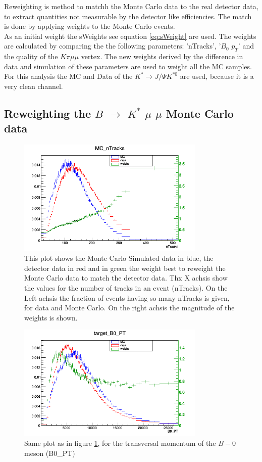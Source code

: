 \documentclass[english]{uzhpub}
\begin{document}
 Reweighting is method to matchh the Monte Carlo data to the real detector data, to extract quantities not measurable by the detector like efficiencies. The match is done by applying weights to the Monte Carlo events. \\
As an initial weight the sWeights see equation \ref{eq:sWeight} are used. The weights are calculated by comparing the the following parameters: 'nTracks', '$B_0$ $p_T$' and the quality of the $K \pi \mu \mu$ vertex. The new weights derived by the difference in data and simulation of these parameters are used to weight all the MC samples. For this analysis the MC and Data of the $K^* \rightarrow J/ \Psi K^{*0}$ are used, because it is a very clean channel.

\subsection{Reweighting the $B$ $\rightarrow$ $K^{*}$ $\mu$ $\mu$ Monte Carlo data}

\begin{figure}[H]
\centering
\includegraphics[width=0.8\textwidth]{Reweighting/nTracksw}
\caption{This plot shows the Monte Carlo Simulated data in blue, the detector data in red and in green the weight best to reweight the Monte Carlo data to match the detector data. Thx X achsis show the values for the number of tracks in an event (nTracks). On the Left achsis the fraction of events having so many nTracks is given, for data and Monte Carlo. On the right achsis the magnitude of the weights is shown.}
\label{fig:nTracksw}
\end{figure}

\begin{figure}[H]
\centering
\includegraphics[width=0.8\textwidth]{Reweighting/B0_PTw}
\caption{Same plot as in figure \ref{fig:nTracksw}, for the transversal momentum of the $B-0$ meson (B0\_PT)}
\label{fig:B0_PTw}
\end{figure}
\end{document}
